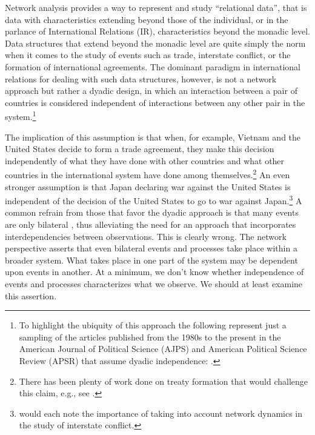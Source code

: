 \documentclass[12pt,pdflatex]{elsarticle}
\begin{document}
Network analysis provides a way to represent and study ``relational data'', that is data with characteristics extending beyond those of the individual, or in the parlance of International Relations (IR), characteristics beyond the monadic level. Data structures that extend beyond the monadic level are quite simply the norm when it comes to the study of events such as trade, interstate conflict, or the formation of international agreements. The dominant paradigm in  international relations for dealing with such data structures, however, is not a network approach but rather a dyadic design, in which an interaction between a pair of countries is considered independent of interactions between any other pair in the system.\footnote{To highlight the ubiquity of this approach the following represent just a sampling of the articles published from the 1980s to the present in the American Journal of Political Science (AJPS) and American Political Science Review (APSR) that assume dyadic independence: \citet{dixon:1983,mansfield:etal:2000,lemke:reed:2001a,mitchell:2002,dafoe:2011a,fuhrmann:sechser:2014,carnegie:2014}.} 

The implication of this assumption is that when, for example, Vietnam and the United States decide to form a trade agreement, they make this decision independently of what they have done with other countries and what other countries in the international system have done among themselves.\footnote{There has been plenty of work done on treaty formation that would challenge this claim, e.g., see \citet{manger:etal:2012,kinne:2013}.} An even stronger assumption is that Japan declaring war against the United States is independent of the decision of the United States to go to war against Japan.\footnote{\citet{maoz:etal:2006,ward:etal:2007,minhas:etal:2016} would each note the importance of taking into account network dynamics in the study of interstate conflict.} A common refrain from those that favor the dyadic approach is that many events are only bilateral \citep{diehl:wright:2016}, thus alleviating the need for an approach that incorporates interdependencies between observations. This is clearly wrong. The network perspective asserts that even bilateral events and processes take place within a broader system. What takes place in one part of the system may be dependent upon events in another. At a minimum, we don't know whether independence of events and processes characterizes what we observe. We should at least examine this assertion.  
\end{document}
